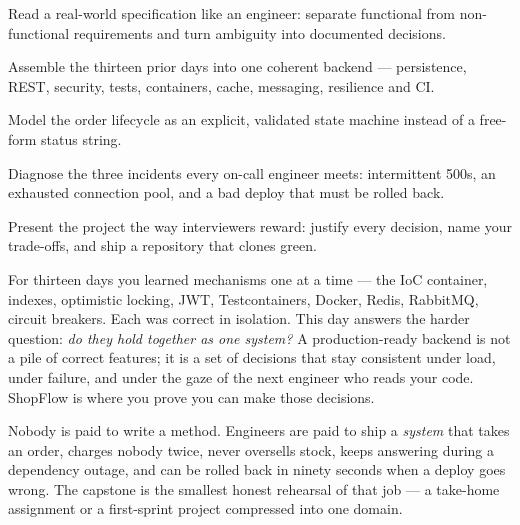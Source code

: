 
\begin{objectives}
\begin{wbitem}
  \item Read a real-world specification like an engineer: separate functional from non-functional requirements and turn ambiguity into documented decisions.
  \item Assemble the thirteen prior days into one coherent backend --- persistence, REST, security, tests, containers, cache, messaging, resilience and CI.
  \item Model the order lifecycle as an explicit, validated state machine instead of a free-form status string.
  \item Diagnose the three incidents every on-call engineer meets: intermittent 500s, an exhausted connection pool, and a bad deploy that must be rolled back.
  \item Present the project the way interviewers reward: justify every decision, name your trade-offs, and ship a repository that clones green.
\end{wbitem}
\end{objectives}


 For thirteen days you learned mechanisms one at a time --- the IoC container, indexes, optimistic locking, JWT, Testcontainers, Docker, Redis, RabbitMQ, circuit breakers. Each was correct in isolation. This day answers the harder question: \emph{do they hold together as one system?} A production-ready backend is not a pile of correct features; it is a set of decisions that stay consistent under load, under failure, and under the gaze of the next engineer who reads your code. ShopFlow is where you prove you can make those decisions.

 Nobody is paid to write a  method. Engineers are paid to ship a \emph{system} that takes an order, charges nobody twice, never oversells stock, keeps answering during a dependency outage, and can be rolled back in ninety seconds when a deploy goes wrong. The capstone is the smallest honest rehearsal of that job --- a take-home assignment or a first-sprint project compressed into one domain.

